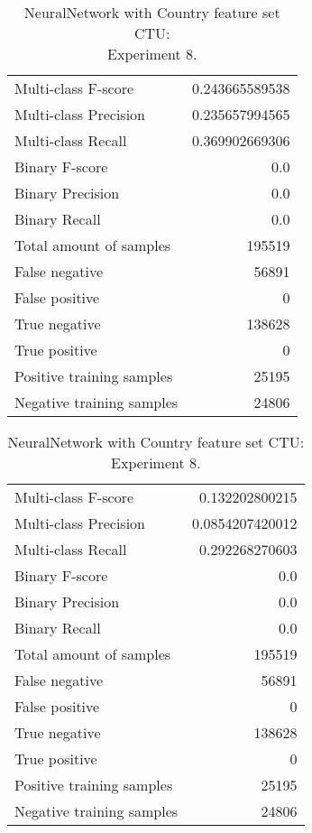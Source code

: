 \begin{table}[H]
\begin{minipage}{0.5\textwidth}
\caption{NeuralNetwork with Country feature set CTU: \\Experiment 7.}
\centering
\begin{tabular}{l r}
\toprule
Multi-class F-score & 0.243665589538 \\
Multi-class Precision & 0.235657994565 \\
Multi-class Recall & 0.369902669306 \\
\midrule
Binary F-score & 0.0 \\
Binary Precision & 0.0 \\
Binary Recall & 0.0 \\
\midrule
Total amount of samples & 195519 \\
False negative & 56891 \\
False positive & 0 \\
True negative & 138628 \\
True positive & 0 \\
\midrule
Positive training samples & 25195 \\
Negative training samples & 24806 \\
\bottomrule
\end{tabular}
\end{minipage}
\hfillx
\begin{minipage}{0.5\textwidth}
\caption{NeuralNetwork with Country feature set CTU: \\Experiment 8.}
\centering
\begin{tabular}{l r}
\toprule
Multi-class F-score & 0.132202800215 \\
Multi-class Precision & 0.0854207420012 \\
Multi-class Recall & 0.292268270603 \\
\midrule
Binary F-score & 0.0 \\
Binary Precision & 0.0 \\
Binary Recall & 0.0 \\
\midrule
Total amount of samples & 195519 \\
False negative & 56891 \\
False positive & 0 \\
True negative & 138628 \\
True positive & 0 \\
\midrule
Positive training samples & 25195 \\
Negative training samples & 24806 \\
\bottomrule
\end{tabular}
\end{minipage}
\end{table}
